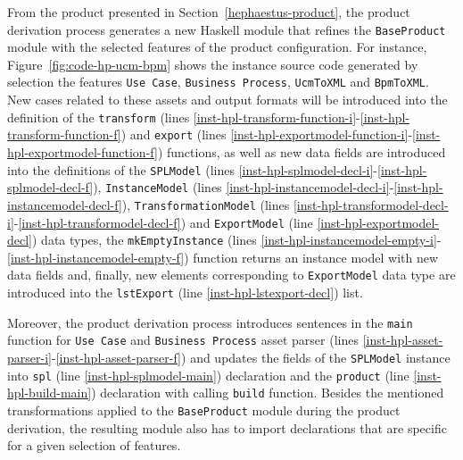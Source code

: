 From the \hp{} product presented in Section~\ref{hephaestus-product}, the product derivation process generates a
new Haskell module that refines the \texttt{BaseProduct} module with the
selected features of the product configuration. 
For instance, Figure~\ref{fig:code-hp-ucm-bpm} shows the \hpl{} instance source code generated by selection the features \texttt{Use Case}, \texttt{Business Process}, \texttt{UcmToXML} and \texttt{BpmToXML}. 
New cases related to these assets and output formats will be introduced into the definition of the
\texttt{transform} (lines \ref{inst-hpl-transform-function-i}-\ref{inst-hpl-transform-function-f}) and
\texttt{export} (lines \ref{inst-hpl-exportmodel-function-i}-\ref{inst-hpl-exportmodel-function-f}) functions,
as well as new data fields are introduced into the definitions of the
\texttt{SPLModel} (lines \ref{inst-hpl-splmodel-decl-i}-\ref{inst-hpl-splmodel-decl-f}),
\texttt{InstanceModel} (lines \ref{inst-hpl-instancemodel-decl-i}-\ref{inst-hpl-instancemodel-decl-f}),
\texttt{TransformationModel} (lines \ref{inst-hpl-transformodel-decl-i}-\ref{inst-hpl-transformodel-decl-f})
and \texttt{ExportModel} (line \ref{inst-hpl-exportmodel-decl}) data types,
the \texttt{mkEmptyInstance} (lines \ref{inst-hpl-instancemodel-empty-i}-\ref{inst-hpl-instancemodel-empty-f}) function returns an instance model with new data fields and, finally, new elements corresponding to \texttt{ExportModel} data type are introduced into the \texttt{lstExport} (line \ref{inst-hpl-lstexport-decl}) list.

Moreover, the \hpl{} product derivation process introduces sentences in the \texttt{main} function for
\texttt{Use Case} and \texttt{Business Process} asset parser (lines \ref{inst-hpl-asset-parser-i}-\ref{inst-hpl-asset-parser-f}) and updates the fields of the \texttt{SPLModel} instance into
\texttt{spl} (line \ref{inst-hpl-splmodel-main}) declaration and the
\texttt{product} (line \ref{inst-hpl-build-main}) declaration with calling \texttt{build} function.
Besides the mentioned transformations applied to the
\texttt{BaseProduct} module during the product derivation, the
resulting module also has to import declarations that are specific for a given
selection of features.

